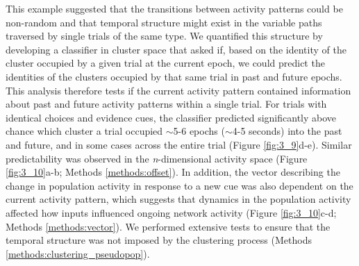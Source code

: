 \bigskip
This example suggested that the transitions between activity patterns could be non-random and that temporal structure might exist in the variable paths traversed by single trials of the same type. We quantified this structure by developing a classifier in cluster space that asked if, based on the identity of the cluster occupied by a given trial at the current epoch, we could predict the identities of the clusters occupied by that same trial in past and future epochs. This analysis therefore tests if the current activity pattern contained information about past and future activity patterns within a single trial. For trials with identical choices and evidence cues, the classifier predicted significantly above chance which cluster a trial occupied $\sim$5-6 epochs ($\sim$4-5 seconds) into the past and future, and in some cases across the entire trial (Figure \ref{fig:3_9}d-e).  Similar predictability was observed in the \textit{n}-dimensional activity space (Figure \ref{fig:3_10}a-b; Methods \ref{methods:offset}). In addition, the vector describing the change in population activity in response to a new cue was also dependent on the current activity pattern, which suggests that dynamics in the population activity affected how inputs influenced ongoing network activity (Figure \ref{fig:3_10}c-d; Methods \ref{methods:vector}). We performed extensive tests to ensure that the temporal structure was not imposed by the clustering process (Methods \ref{methods:clustering_pseudopop}). 


